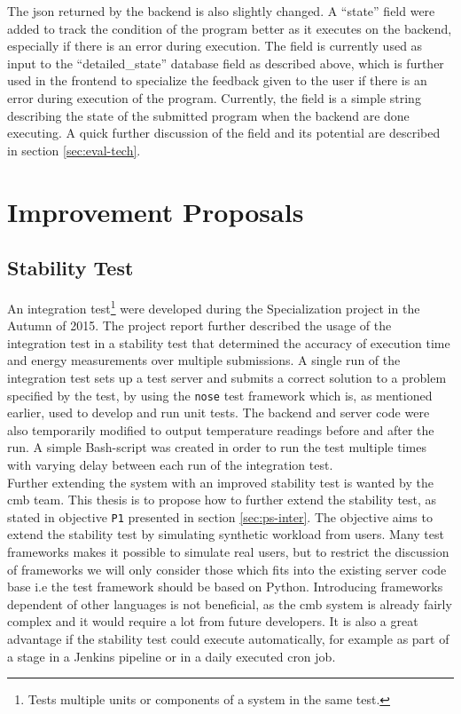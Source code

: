 The \gls{json} returned by the backend is also slightly changed. A ``state'' field were added to track the condition of the program better as it executes on the backend, especially if there is an error during execution. The field is currently used as input to the ``detailed\_state'' database field as described above, which is further used in the frontend to specialize the feedback given to the user if there is an error during execution of the program. Currently, the field is a simple string describing the state of the submitted program when the backend are done executing. A quick further discussion of the field and its potential are described in section \ref{sec:eval-tech}.

\section{Improvement Proposals}

\subsection{Stability Test}
An integration test\footnote{Tests multiple units or components of a system in the same test.} were developed during the Specialization project in the Autumn of 2015. The project report further described the usage of the integration test in a stability test that determined the accuracy of execution time and energy measurements over multiple submissions. A single run of the integration test sets up a test server and submits a correct solution to a problem specified by the test, by using the \texttt{nose} test framework which is, as mentioned earlier, used to develop and run unit tests. The backend and server code were also temporarily modified to output temperature readings before and after the run. A simple Bash-script was created in order to run the test multiple times with varying delay between each run of the integration test. \\

Further extending the system with an improved stability test is wanted by the \gls{cmb} team. This thesis is to propose how to further extend the stability test, as stated in objective \texttt{P1} presented in section \ref{sec:ps-inter}. The objective aims to extend the stability test by simulating synthetic workload from users. Many test frameworks makes it possible to simulate real users, but to restrict the discussion of frameworks we will only consider those which fits into the existing server code base i.e the test framework should be based on Python. Introducing frameworks dependent of other languages is not beneficial, as the \gls{cmb} system is already fairly complex and it would require a lot from future developers. It is also a great advantage if the stability test could execute automatically, for example as part of a stage in a Jenkins pipeline or in a daily executed cron job. \\

